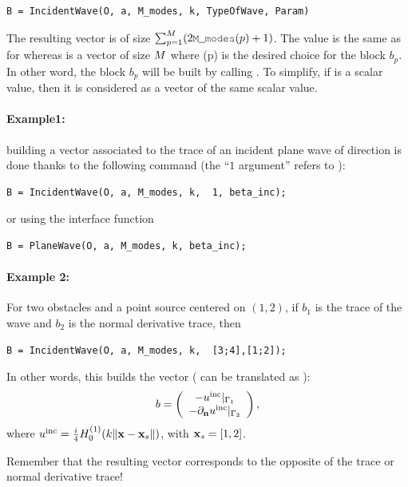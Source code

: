 \subsubsection{}
\label{secFun:IncidentWave}

\begin{lstlisting}
B = IncidentWave(O, a, M_modes, k, TypeOfWave, Param)
\end{lstlisting}
The resulting vector  is of size $\sum_{p=1}^{\Nscat}(2\code{M\_modes}(p)+1)$. The value  is the same as for \BlockIncidentWave whereas  is a vector of size $M$ where (p) is the desired choice for the block $b_p$. In other word, the block $b_p$ will be built by calling . To simplify, if  is a scalar value, then it is considered as a vector of the same scalar value.

\paragraph{Example1:} building a vector associated to the trace of an incident plane wave of direction  is done thanks to the following command (the ``$1$ argument'' refers to ):
\begin{lstlisting}
B = IncidentWave(O, a, M_modes, k,  1, beta_inc);
\end{lstlisting}
or using the interface function
\begin{lstlisting}
B = PlaneWave(O, a, M_modes, k, beta_inc);
\end{lstlisting}
\paragraph{Example 2:} For two obstacles and a point source centered on $(1,2)$, if $b_1$ is the trace of the wave and $b_2$ is the normal derivative trace, then
\begin{lstlisting}
B = IncidentWave(O, a, M_modes, k,  [3;4],[1;2]);
\end{lstlisting}
In other words, this builds the vector (\code{[3,4]} can be translated as ):
$$
b = \left(\begin{array}{c}
-u^{\textrm{inc}}|_{\Gamma_1}\\
-\partial_{\mathbf{n}}u^{\textrm{inc}}|_{\Gamma_2}\\
\end{array}\right),
$$
where $u^{\textrm{inc}} = \frac{i}{4}H_0^{(1)}(k\|{\mathbf{x}}-{\mathbf{x}}_s\|)$, with ${\mathbf{x}}_s = [1,2]$.
\begin{remark}
Remember that the resulting vector corresponds to the opposite of the trace or normal derivative trace!
\end{remark}


